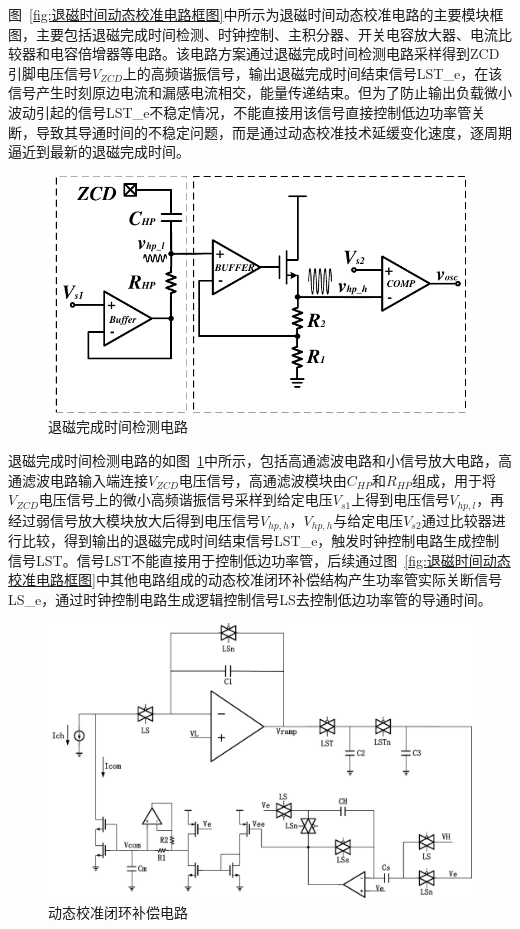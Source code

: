 图~\ref{fig:退磁时间动态校准电路框图}中所示为退磁时间动态校准电路的主要模块框图，主要包括退磁完成时间检测、时钟控制、主积分器、开关电容放大器、电流比较器和电容倍增器等电路。该电路方案通过退磁完成时间检测电路采样得到ZCD引脚电压信号$V_{ZCD}$上的高频谐振信号，输出退磁完成时间结束信号LST\_e，在该信号产生时刻原边电流和漏感电流相交，能量传递结束。但为了防止输出负载微小波动引起的信号LST\_e不稳定情况，不能直接用该信号直接控制低边功率管关断，导致其导通时间的不稳定问题，而是通过动态校准技术延缓变化速度，逐周期逼近到最新的退磁完成时间。

\begin{figure}[htbp] 
    \centering
    \includegraphics[width=0.6\linewidth]{figures/退磁时间检测电路.pdf}
    \caption{退磁完成时间检测电路}
    \label{fig:退磁时间检测电路}
\end{figure} 

退磁完成时间检测电路的如图~\ref{fig:退磁时间检测电路}中所示，包括高通滤波电路和小信号放大电路，高通滤波电路输入端连接$V_{ZCD}$电压信号，高通滤波模块由$C_{HP}$和$R_{HP}$组成，用于将$V_{ZCD}$电压信号上的微小高频谐振信号采样到给定电压$V_{s1}$上得到电压信号$V_{hp,l}$，再经过弱信号放大模块放大后得到电压信号$V_{hp,h}$，$V_{hp,h}$与给定电压$V_{s2}$通过比较器进行比较，得到输出的退磁完成时间结束信号LST\_e，触发时钟控制电路生成控制信号LST。信号LST不能直接用于控制低边功率管，后续通过图~\ref{fig:退磁时间动态校准电路框图}中其他电路组成的动态校准闭环补偿结构产生功率管实际关断信号LS\_e，通过时钟控制电路生成逻辑控制信号LS去控制低边功率管的导通时间。

\begin{figure}[htbp] 
    \centering
    \includegraphics[width=0.8\linewidth]{figures/主积分器环路电路.pdf}
    \caption{动态校准闭环补偿电路}
    \label{fig:动态校准闭环补偿电路}
\end{figure} 

